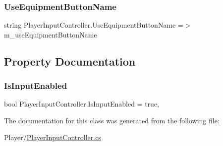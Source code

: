 \subsubsection{\texorpdfstring{Use\+Equipment\+Button\+Name}{UseEquipmentButtonName}}
{\footnotesize\ttfamily string Player\+Input\+Controller.\+Use\+Equipment\+Button\+Name =$>$ m\+\_\+use\+Equipment\+Button\+Name}



\subsection{Property Documentation}
\mbox{\label{class_player_input_controller_ad55f46ff15ca7bfc577167007336e5c7}} 
\subsubsection{\texorpdfstring{Is\+Input\+Enabled}{IsInputEnabled}}
{\footnotesize\ttfamily bool Player\+Input\+Controller.\+Is\+Input\+Enabled = true\hspace{0.3cm}{\ttfamily [get]}, {\ttfamily [set]}}



The documentation for this class was generated from the following file\+:\begin{DoxyCompactItemize}
\item 
Player/\mbox{\hyperlink{_player_input_controller_8cs}{Player\+Input\+Controller.\+cs}}\end{DoxyCompactItemize}
